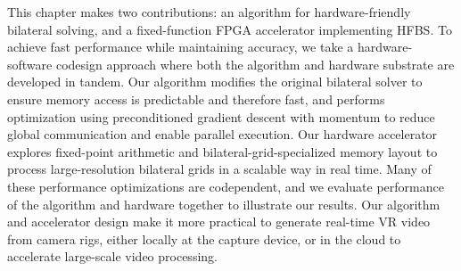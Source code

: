This chapter makes two contributions: an algorithm for hardware-friendly bilateral solving, and a fixed-function FPGA accelerator implementing HFBS.
To achieve fast performance while maintaining accuracy, we take a hardware-software codesign approach where both the algorithm and hardware substrate are developed in tandem.
Our algorithm modifies the original bilateral solver to ensure memory access is predictable and therefore fast, and performs optimization using preconditioned gradient descent with momentum to reduce global communication and enable parallel execution.
Our hardware accelerator explores fixed-point arithmetic and bilateral-grid-specialized memory layout to process large-resolution bilateral grids in a scalable way in real time.
Many of these performance optimizations are codependent, and we evaluate performance of the algorithm and hardware together to illustrate our results.
Our algorithm and accelerator design make it more practical to generate real-time VR video from camera rigs, either locally at the capture device, or in the cloud to accelerate large-scale video processing.
